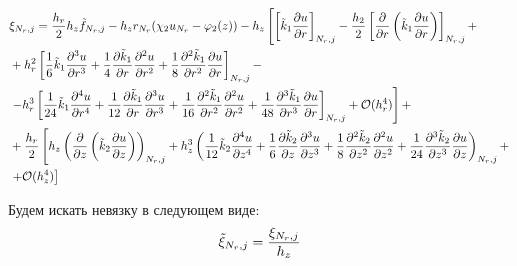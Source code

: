 \begin{align*}
  &\xi_{N_r, j} = \frac{h_r}{2} h_z \Tilde{f}_{N_r, j} - h_z r_{N_r} ( \chi_2 u_{N_r} - \varphi_2(z)) -
  h_z\left[
    \left[ \Tilde{k}_1 \frac{\partial u}{\partial r} \right]_{N_r, j} -
    \frac{h_2}{2} \left[ \frac{\partial }{\partial r} \left( \Tilde{k}_1 \frac{\partial u}{\partial r} \right) \right]_{N_r, j} + \right.\\
    & + h^2_r \left[
    \frac{1}{6} \Tilde{k}_1 \frac{\partial^3 u}{\partial r^3} +
    \frac{1}{4} \frac{\partial \Tilde{k}_1}{\partial r} \frac{\partial^2 u}{\partial r^2} +
    \frac{1}{8} \frac{\partial^2 \Tilde{k}_1}{\partial r^2} \frac{\partial u}{\partial r}
   \right]_{N_r, j} -\\
   &\left. -h^3_r \left[ 
    \frac{1}{24} \Tilde{k}_1 \frac{\partial^4 u}{\partial r^4} +
    \frac{1}{12} \frac{\partial \Tilde{k}_1}{\partial r} \frac{\partial^3 u}{\partial r^3} +
    \frac{1}{16} \frac{\partial^2 \Tilde{k}_1}{\partial r^2} \frac{\partial^2 u}{\partial r^2} +
    \frac{1}{48} \frac{\partial^3 \Tilde{k}_1}{\partial r^3} \frac{\partial u}{\partial r}
  \right]_{N_r, j} + \mathcal{O}(h^4_r) \right] + \\
  &+ \frac{h_r}{2} \left[
    h_z \left(\frac{\partial}{\partial z} \left( \Tilde{k}_2 \frac{\partial u}{\partial z} \right) \right)_{N_r, j}
    + h^3_z \left( 
      \frac{1}{12} \Tilde{k}_2 \frac{\partial^4 u}{\partial z^4} +
      \frac{1}{6} \frac{\partial \Tilde{k}_2}{\partial z} \frac{\partial^3 u}{\partial z^3} +
      \frac{1}{8} \frac{\partial^2 \Tilde{k}_2}{\partial z^2} \frac{\partial^2 u}{\partial z^2} +
      \frac{1}{24} \frac{\partial^3 \Tilde{k}_2}{\partial z^3} \frac{\partial u}{\partial z}
    \right)_{N_r, j} +
  \right. \\
  &\left. +  \mathcal{O}(h^4_z) \right]
\end{align*}

Будем искать невязку в следующем виде:
\[
  \Tilde{\xi}_{N_r, j} = \frac{\xi_{N_r, j}}{h_z}
\]

